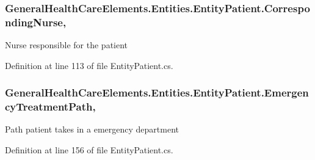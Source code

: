 \subsubsection[{\texorpdfstring{Corresponding\+Nurse}{CorrespondingNurse}}]{ General\+Health\+Care\+Elements.\+Entities.\+Entity\+Patient.\+Corresponding\+Nurse\hspace{0.3cm}{\ttfamily [get]}, {\ttfamily [set]}}\hypertarget{class_general_health_care_elements_1_1_entities_1_1_entity_patient_a93004bcae55083645db3e11c7220088f}{}\label{class_general_health_care_elements_1_1_entities_1_1_entity_patient_a93004bcae55083645db3e11c7220088f}


Nurse responsible for the patient 



Definition at line 113 of file Entity\+Patient.\+cs.

\subsubsection[{\texorpdfstring{Emergency\+Treatment\+Path}{EmergencyTreatmentPath}}]{ General\+Health\+Care\+Elements.\+Entities.\+Entity\+Patient.\+Emergency\+Treatment\+Path\hspace{0.3cm}{\ttfamily [get]}, {\ttfamily [set]}}\hypertarget{class_general_health_care_elements_1_1_entities_1_1_entity_patient_a42d60257bf253a6329b7c82d01607590}{}\label{class_general_health_care_elements_1_1_entities_1_1_entity_patient_a42d60257bf253a6329b7c82d01607590}


Path patient takes in a emergency department 



Definition at line 156 of file Entity\+Patient.\+cs.

